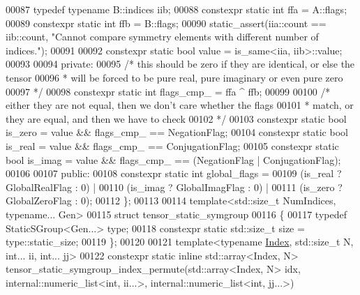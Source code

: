 \begin{DoxyCode}
00087     \textcolor{keyword}{typedef} \textcolor{keyword}{typename} B::indices iib;
00088     constexpr \textcolor{keyword}{static} \textcolor{keywordtype}{int} ffa = A::flags;
00089     constexpr \textcolor{keyword}{static} \textcolor{keywordtype}{int} ffb = B::flags;
00090     static\_assert(iia::count == iib::count, \textcolor{stringliteral}{"Cannot compare symmetry elements with different number of
       indices."});
00091 
00092     constexpr \textcolor{keyword}{static} \textcolor{keywordtype}{bool} value = is\_same<iia, iib>::value;
00093 
00094   \textcolor{keyword}{private}:
00095     \textcolor{comment}{/* this should be zero if they are identical, or else the tensor}
00096 \textcolor{comment}{     * will be forced to be pure real, pure imaginary or even pure zero}
00097 \textcolor{comment}{     */}
00098     constexpr \textcolor{keyword}{static} \textcolor{keywordtype}{int} flags\_cmp\_ = ffa ^ ffb;
00099 
00100     \textcolor{comment}{/* either they are not equal, then we don't care whether the flags}
00101 \textcolor{comment}{     * match, or they are equal, and then we have to check}
00102 \textcolor{comment}{     */}
00103     constexpr \textcolor{keyword}{static} \textcolor{keywordtype}{bool} is\_zero      = value && flags\_cmp\_ == NegationFlag;
00104     constexpr \textcolor{keyword}{static} \textcolor{keywordtype}{bool} is\_real      = value && flags\_cmp\_ == ConjugationFlag;
00105     constexpr \textcolor{keyword}{static} \textcolor{keywordtype}{bool} is\_imag      = value && flags\_cmp\_ == (NegationFlag | ConjugationFlag);
00106 
00107   \textcolor{keyword}{public}:
00108     constexpr \textcolor{keyword}{static} \textcolor{keywordtype}{int} global\_flags = 
00109       (is\_real ? GlobalRealFlag : 0) |
00110       (is\_imag ? GlobalImagFlag : 0) |
00111       (is\_zero ? GlobalZeroFlag : 0);
00112 \};
00113 
00114 \textcolor{keyword}{template}<std::size\_t NumIndices, \textcolor{keyword}{typename}... Gen>
00115 \textcolor{keyword}{struct }tensor\_static\_symgroup
00116 \{
00117   \textcolor{keyword}{typedef} StaticSGroup<Gen...> type;
00118   constexpr \textcolor{keyword}{static} std::size\_t size = type::static\_size;
00119 \};
00120 
00121 \textcolor{keyword}{template}<\textcolor{keyword}{typename} \hyperlink{namespace_eigen_a62e77e0933482dafde8fe197d9a2cfde}{Index}, std::size\_t N, \textcolor{keywordtype}{int}... ii, \textcolor{keywordtype}{int}... jj>
00122 constexpr \textcolor{keyword}{static} \textcolor{keyword}{inline} std::array<Index, N> tensor\_static\_symgroup\_index\_permute(std::array<Index, N> idx,
       internal::numeric\_list<int, ii...>, internal::numeric\_list<int, jj...>)

\end{DoxyCode}

